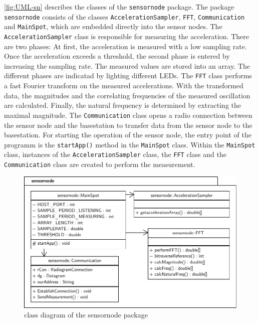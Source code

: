 \documentclass[12pt,a4paper]{scrartcl}
\begin{document}
\autoref{fig:UML-sn} describes the classes of the \texttt{sensor\-node} package.
The package \texttt{sensor\-node} consists of the classes \texttt{Acceleration\-Sampler}, \texttt{FFT}, \texttt{Communi\-cation} and \texttt{Main\-Spot}, which are embedded directly into the sensor nodes.
The \texttt{Acceleration\-Sampler} class is responsible for measuring the acceleration.
There are two phases: At first, the acceleration is measured with a low sampling rate.
Once the acceleration exceeds a threshold, the second phase is entered by increasing the sampling rate. 
The measured values are stored into an array.
The different phases are indicatad by lighting different LEDs.
The \texttt{FFT} class performs a fast Fourier transform on the measured accelerations. 
With the transformed data, the magnitudes and the correlating frequencies of the measured oscillation are calculated.
Finally, the natural frequency is determined by extracting the maximal magnitude.
The \texttt{Communi\-cation} class opens a radio connection between the sensor node and the basestation to transfer data from the sensor node to the basestation.
For starting the operation of the sensor node, the entry point of the programm is the \texttt{start\-App()} method in the \texttt{Main\-Spot} class. 
Within the \texttt{Main\-Spot} class, instances of the \texttt{Acceleration\-Sampler} class, the \texttt{FFT} class and the \texttt{Communication} class are created to perform the measurement.

\begin{figure}[ht]
    \centering
    \includegraphics[width = \textwidth]{figures/uml-sensornode.pdf}
    \caption{class diagram of the sensornode package}
    \label{fig:UML-sn}
\end{figure}
\end{document}
